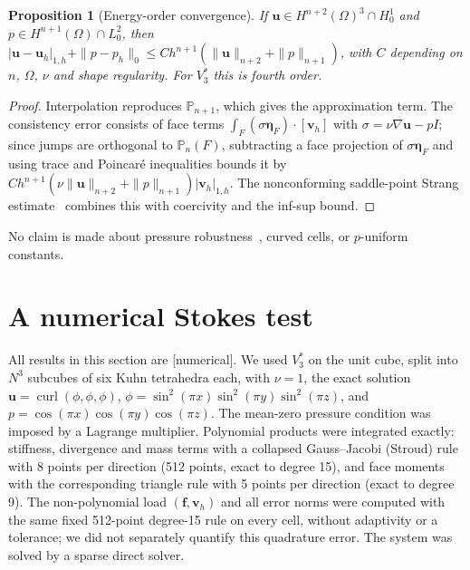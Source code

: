 \documentclass[11pt,a4paper]{article}
\newtheorem{proposition}[theorem]{Proposition}
\theoremstyle{definition}
\theoremstyle{remark}
\newcommand{\evid}[1]{\textsf{[#1]}}
\newcommand{\Pol}{\mathbb P}
\begin{document}
\begin{proposition}[Energy-order convergence]
\label{prop:error}
If \(\mathbf u\in H^{n+2}(\Omega)^3\cap H^1_0\) and \(p\in H^{n+1}(\Omega)\cap L^2_0\), then
\(|\mathbf u-\mathbf u_h|_{1,h}+\|p-p_h\|_0\le C h^{n+1}
(\|\mathbf u\|_{n+2}+\|p\|_{n+1})\), with \(C\) depending on \(n\), \(\Omega\),
\(\nu\) and shape regularity. For \(V_3^*\) this is fourth order.
\end{proposition}

\begin{proof}
Interpolation reproduces \(\Pol_{n+1}\), which gives the approximation term.
The consistency error consists of face terms \(\int_F(\sigma\boldsymbol\eta_F)\cdot
[\mathbf v_h]\) with \(\sigma=\nu\nabla\mathbf u-pI\); since jumps are orthogonal to
\(\Pol_n(F)\), subtracting a face projection of \(\sigma\boldsymbol\eta_F\) and using
trace and Poincaré inequalities bounds it by
\(Ch^{n+1}(\nu\|\mathbf u\|_{n+2}+\|p\|_{n+1})|\mathbf v_h|_{1,h}\). The
nonconforming saddle-point Strang estimate~\cite[Ch.~5]{BBF2013} combines this
with coercivity and the inf-sup bound.
\end{proof}

No claim is made about pressure robustness~\cite{JLMNR2017}, curved cells,
or \(p\)-uniform constants.

\section{A numerical Stokes test}
\label{sec:numerics}

All results in this section are \evid{numerical}. We used \(V_3^*\) on the unit
cube, split into \(N^3\) subcubes of six Kuhn tetrahedra each, with
\(\nu=1\), the exact solution
\(\mathbf u=\operatorname{curl}(\phi,\phi,\phi)\),
\(\phi=\sin^2(\pi x)\sin^2(\pi y)\sin^2(\pi z)\), and
\(p=\cos(\pi x)\cos(\pi y)\cos(\pi z)\). The mean-zero pressure condition was
imposed by a Lagrange multiplier. Polynomial products were integrated
exactly: stiffness, divergence and mass terms with a collapsed
Gauss--Jacobi (Stroud) rule with 8 points per direction (512 points,
exact to degree 15), and face moments with the corresponding triangle rule
with 5 points per direction (exact to degree 9). The non-polynomial load
\((\mathbf f,\mathbf v_h)\) and all error norms were computed with the same
fixed 512-point degree-15 rule on every cell, without adaptivity or a
tolerance; we did not separately quantify this quadrature error. The
system was solved by a sparse direct solver.
\end{document}
